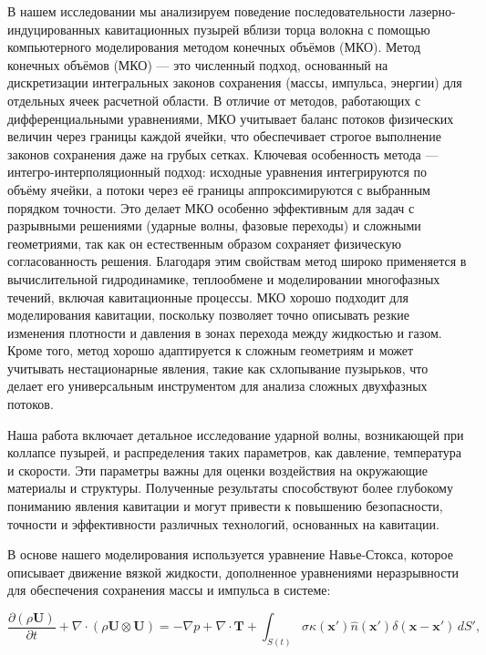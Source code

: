 В нашем исследовании мы анализируем поведение последовательности лазерно-индуцированных кавитационных пузырей вблизи торца волокна с помощью компьютерного моделирования методом конечных объёмов (МКО). 
Метод конечных объёмов (МКО) — это численный подход, основанный на дискретизации интегральных законов сохранения (массы, импульса, энергии) для отдельных ячеек расчетной области. 
В отличие от методов, работающих с дифференциальными уравнениями, МКО учитывает баланс потоков физических величин через границы каждой ячейки, что обеспечивает строгое выполнение законов сохранения даже на грубых сетках. 
Ключевая особенность метода — интегро-интерполяционный подход: исходные уравнения интегрируются по объёму ячейки, а потоки через её границы аппроксимируются с выбранным порядком точности. 
Это делает МКО особенно эффективным для задач с разрывными решениями (ударные волны, фазовые переходы) и сложными геометриями, так как он естественным образом сохраняет физическую согласованность решения. 
Благодаря этим свойствам метод широко применяется в вычислительной гидродинамике, теплообмене и моделировании многофазных течений, включая кавитационные процессы.
МКО хорошо подходит для моделирования кавитации, поскольку позволяет точно описывать резкие изменения плотности и давления в зонах перехода между жидкостью и газом. 
Кроме того, метод хорошо адаптируется к сложным геометриям и может учитывать нестационарные явления, такие как схлопывание пузырьков, что делает его универсальным инструментом для анализа сложных двухфазных потоков.


Наша работа включает детальное исследование ударной волны, возникающей при коллапсе пузырей, и распределения таких параметров, как давление, температура и скорости.
Эти параметры важны для оценки воздействия на окружающие материалы и структуры.
Полученные результаты способствуют более глубокому пониманию явления кавитации и могут привести к повышению безопасности, точности и эффективности различных технологий, основанных на кавитации.

В основе нашего моделирования используется уравнение Навье-Стокса, которое описывает движение вязкой жидкости, дополненное уравнениями неразрывности для обеспечения сохранения массы и импульса в системе:

\vspace{1em}
\begin{equation}
    \frac{\partial (\rho \mathbf{U})}{\partial t} + \nabla \cdot (\rho \mathbf{U} \otimes \mathbf{U}) = -\nabla p + \nabla \cdot \mathbf{T}
    + \int_{S(t)} \sigma \kappa (\mathbf{x'}) \hat{n}(\mathbf{x'}) \delta (\mathbf{x} - \mathbf{x'}) \, dS' ,
\end{equation}

